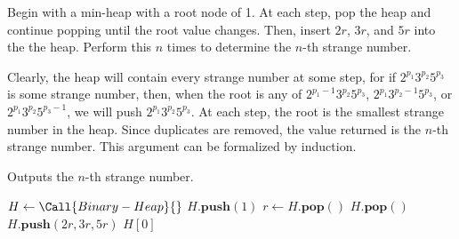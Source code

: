 \documentclass[final]{article}
\begin{document}
\begin{solution}
    Begin with a min-heap with a root node of 1. At each step, pop the heap and
    continue popping until the root value changes. Then, insert $2r$, $3r$, and
    $5r$ into the the heap. Perform this $n$ times to determine the $n$-th
    strange number.

    Clearly, the heap will contain every strange number at some step, for if
    $2^{p_1}3^{p_2}5^{p_3}$ is some strange number, then, when the root is any
    of $2^{p_1-1}3^{p_2}5^{p_3}$, $2^{p_1}3^{p_2-1}5^{p_3}$, or
    $2^{p_1}3^{p_2}5^{p_3-1}$, we will push $2^{p_1}3^{p_2}5^{p_3}$. At each step,
    the root is the smallest strange number in the heap. Since duplicates are
    removed, the value returned is the $n$-th strange number. This argument can
    be formalized by induction.

    \begin{algorithm}[H]
        \caption{Outputs the $n$-th strange number.}
        \begin{algorithmic}[1]
            \State $H \gets \Call{Binary-Heap}{}$
            \State \(H.\textbf{push}(1)\)
            \State \(r\gets H.{\textbf{pop}}()\)\label{line:uglytarget}
             
            \State \(H.{\textbf{pop}}()\)\label{line:uglyduplicate}
            \EndWhile
            \State \(H.\textbf{push}\left(2r, 3r, 5r\right)\) \label{line:uglypush}
            \EndForRange
            \State \Return \(H[0]\)
        \EndFunction
    \end{algorithmic}
    \end{algorithm}
\end{solution}
\end{document}
